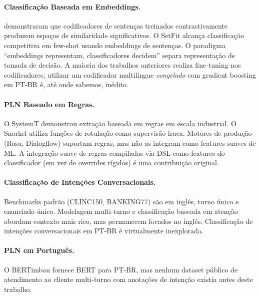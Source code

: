 \documentclass[11pt]{article}
\begin{document}
\paragraph{Classificação Baseada em Embeddings.} \citet{reimers2019sentencebert} demonstraram que codificadores de sentenças treinados contrastivamente produzem espaços de similaridade significativos. O SetFit \citep{tunstall2022setfit} alcança classificação competitiva em few-shot usando embeddings de sentenças. O paradigma ``embeddings representam, classificadores decidem'' \citep{anthusai2024embeddings} separa representação de tomada de decisão. A maioria dos trabalhos anteriores realiza fine-tuning nos codificadores; utilizar um codificador multilíngue \emph{congelado} com gradient boosting em PT-BR é, até onde sabemos, inédito.

\paragraph{PLN Baseado em Regras.} O SystemT \citep{chiticariu2013systemT} demonstrou extração baseada em regras em escala industrial. O Snorkel \citep{ratner2017snorkel} utiliza funções de rotulação como supervisão fraca. Motores de produção (Rasa, Dialogflow) suportam regras, mas não as integram como features suaves de ML. A integração suave de regras compiladas via DSL como features do classificador (em vez de overrides rígidos) é uma contribuição original.

\paragraph{Classificação de Intenções Conversacionais.} Benchmarks padrão (CLINC150, BANKING77) são em inglês, turno único e enunciado único. Modelagem multi-turno \citep{zhang2021multi} e classificação baseada em atenção \citep{lyu2025attention} abordam contexto mais rico, mas permanecem focados no inglês. Classificação de intenções conversacionais em PT-BR é virtualmente inexplorada.

\paragraph{PLN em Português.} O BERTimbau \citep{souza2020bertimbau} fornece BERT para PT-BR, mas nenhum dataset público de atendimento ao cliente multi-turno com anotações de intenção existia antes deste trabalho.


\end{document}
